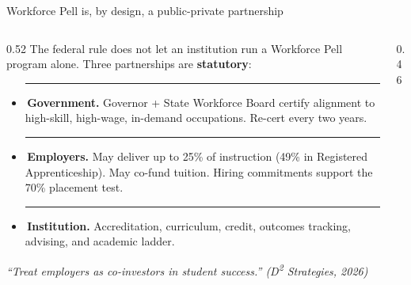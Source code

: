 \documentclass[aspectratio=169,11pt]{beamer}
\newcommand{\monoLabel}[1]{%
  {\ttfamily\fontsize{7.5pt}{9pt}\selectfont\color{textMuted}#1}%
}
\newcommand{\theEyebrowText}{}
\newcommand{\frametitleEyebrow}[1]{\renewcommand{\theEyebrowText}{#1}}
\newcommand{\pdot}[1]{%
  {\color{#1}\rule[0.15ex]{0.55ex}{0.55ex}}%
}
\begin{document}
\frametitleEyebrow{Operating model / structurally a public-private partnership}
\begin{frame}{Workforce Pell is, by design, a public-private partnership}
  \begin{columns}[T,onlytextwidth]
    \begin{column}{0.52\textwidth}
      \rmfamily\fontsize{10.5pt}{14pt}\selectfont
      \color{textPrimary}
      The federal rule does not let an institution run a
      Workforce Pell program alone. Three partnerships are
      \textbf{statutory}:\par
      \vspace{6pt}
      \begin{itemize}\itemsep2pt
        \item \pdot{cPell}\,\textbf{Government.} Governor +
              State Workforce Board certify alignment to
              high-skill, high-wage, in-demand occupations.
              Re-cert every two years.
        \item \pdot{cBiz}\,\textbf{Employers.} May deliver up
              to 25\% of instruction (49\% in Registered
              Apprenticeship). May co-fund tuition. Hiring
              commitments support the 70\% placement test.
        \item \pdot{cSou}\,\textbf{Institution.} Accreditation,
              curriculum, credit, outcomes tracking, advising,
              and academic ladder.
      \end{itemize}
      \vspace{6pt}
      \color{textSecondary}\itshape\fontsize{10pt}{13pt}\selectfont
      ``Treat employers as co-investors in student success.''
      \monoLabel{(D\textsuperscript{2} Strategies, 2026)}
    \end{column}
    \begin{column}{0.46\textwidth}
      \centering
\end{column}
\end{columns}
\end{frame}
\end{document}
